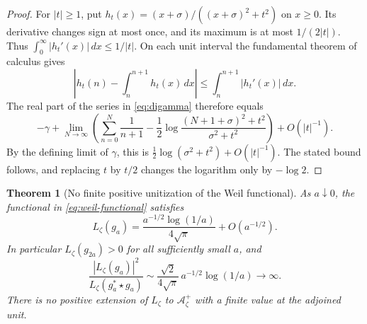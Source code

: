 \documentclass[11pt]{article}
\newtheorem{theorem}{Theorem}[section]
\theoremstyle{definition}
\theoremstyle{remark}
\numberwithin{equation}{section}
\newcommand{\cA}{\mathcal A}
\begin{document}
\begin{proof}
For $|t|\geq1$, put
$h_t(x)=(x+\sigma)/((x+\sigma)^2+t^2)$ on $x\geq0$.
Its derivative changes sign at most once, and its maximum is at most
$1/(2|t|)$.  Thus $\int_0^\infty|h_t'(x)|\,dx\leq1/|t|$.
On each unit interval the fundamental theorem of calculus gives
\[
 \left|h_t(n)-\int_n^{n+1}h_t(x)\,dx\right|
 \leq\int_n^{n+1}|h_t'(x)|\,dx.
\]
The real part of the series in \eqref{eq:digamma} therefore equals
\[
 -\gamma+\lim_{N\to\infty}
 \left(\sum_{n=0}^N\frac1{n+1}
 -\frac12\log\frac{(N+1+\sigma)^2+t^2}{\sigma^2+t^2}\right)
 +O(|t|^{-1}).
\]
By the defining limit of $\gamma$, this is
$\tfrac12\log(\sigma^2+t^2)+O(|t|^{-1})$.
The stated bound follows, and replacing $t$ by $t/2$ changes the logarithm
only by $-\log2$.
\end{proof}

\begin{theorem}[No finite positive unitization of the Weil functional]
\label{thm:weil-mass}
As $a\downarrow0$, the functional in \eqref{eq:weil-functional} satisfies
\begin{equation}
 L_\zeta(g_a)
 =\frac{a^{-1/2}\log(1/a)}{4\sqrt\pi}+O(a^{-1/2}).
 \label{eq:weil-gaussian-asymptotic}
\end{equation}
In particular $L_\zeta(g_{2a})>0$ for all sufficiently small $a$, and
\begin{equation}
 \frac{|L_\zeta(g_a)|^2}{L_\zeta(g_a^*\star g_a)}
 \sim\frac{\sqrt2}{4\sqrt\pi}\,a^{-1/2}\log(1/a)
 \longrightarrow\infty.
 \label{eq:weil-unitization-divergence}
\end{equation}
There is no positive extension of $L_\zeta$ to $\cA_\zeta^+$ with a
finite value at the adjoined unit.
\end{theorem}
\end{document}
